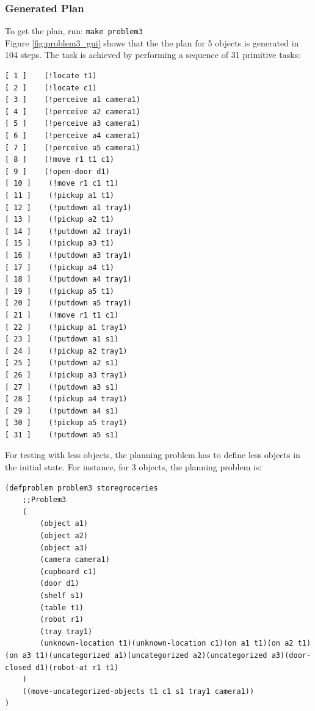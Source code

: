 \documentclass[paper=a4, fontsize=11pt]{scrartcl}
\begin{document}
	\subsubsection*{Generated Plan}
	
	To get the plan, run: \verb|make problem3| \\
	
	Figure \ref{fig:problem3_gui} shows that the the plan for 5 objects is generated in 104 steps. The task is achieved by performing a sequence of 31 primitive tasks: \\
	
	\begin{lstlisting}
[ 1 ]    (!locate t1)
[ 2 ]    (!locate c1)
[ 3 ]    (!perceive a1 camera1)
[ 4 ]    (!perceive a2 camera1)
[ 5 ]    (!perceive a3 camera1)
[ 6 ]    (!perceive a4 camera1)
[ 7 ]    (!perceive a5 camera1)
[ 8 ]    (!move r1 t1 c1)
[ 9 ]    (!open-door d1)
[ 10 ]    (!move r1 c1 t1)
[ 11 ]    (!pickup a1 t1)
[ 12 ]    (!putdown a1 tray1)
[ 13 ]    (!pickup a2 t1)
[ 14 ]    (!putdown a2 tray1)
[ 15 ]    (!pickup a3 t1)
[ 16 ]    (!putdown a3 tray1)
[ 17 ]    (!pickup a4 t1)
[ 18 ]    (!putdown a4 tray1)
[ 19 ]    (!pickup a5 t1)
[ 20 ]    (!putdown a5 tray1)
[ 21 ]    (!move r1 t1 c1)
[ 22 ]    (!pickup a1 tray1)
[ 23 ]    (!putdown a1 s1)
[ 24 ]    (!pickup a2 tray1)
[ 25 ]    (!putdown a2 s1)
[ 26 ]    (!pickup a3 tray1)
[ 27 ]    (!putdown a3 s1)
[ 28 ]    (!pickup a4 tray1)
[ 29 ]    (!putdown a4 s1)
[ 30 ]    (!pickup a5 tray1)
[ 31 ]    (!putdown a5 s1)
	\end{lstlisting}
	
\vspace{5mm}
	
For testing with less objects, the planning problem has to define less objects in the initial state. For instance, for 3 objects, the planning problem is: \\

\begin{lstlisting}
(defproblem problem3 storegroceries
	;;Problem3
	(
		(object a1)
		(object a2)
		(object a3)
		(camera camera1)
		(cupboard c1)
		(door d1)
		(shelf s1)
		(table t1)
		(robot r1)
		(tray tray1)
		(unknown-location t1)(unknown-location c1)(on a1 t1)(on a2 t1)(on a3 t1)(uncategorized a1)(uncategorized a2)(uncategorized a3)(door-closed d1)(robot-at r1 t1)
	)
	((move-uncategorized-objects t1 c1 s1 tray1 camera1))
)
\end{lstlisting}

\vspace{5mm}
\end{document}
